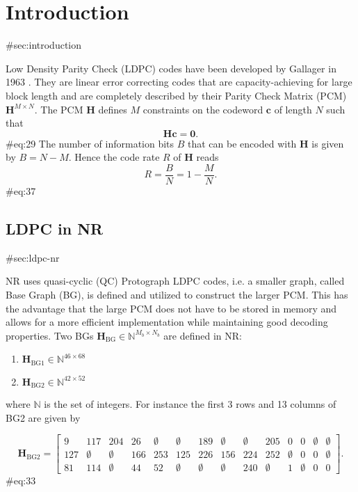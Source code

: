 \documentclass{article}
\def\0{\mathbf{0}}
\def\c{\mathbf{c}}
\def\H{\mathbf{H}}
\def\Hbg{\mathbf{H}_\mathrm{BG}}
\def\Hbgo{\mathbf{H}_\mathrm{BG1}}
\def\Hbgt{\mathbf{H}_\mathrm{BG2}}
\def\Mb{{M_b}}
\def\Nb{{N_b}}
\def\Nbb{\mathbb{N}}
\begin{document}
\newpage
\tableofcontents

\newpage
\section{Introduction} {#sec:introduction}

Low Density Parity Check (LDPC) codes have been developed by Gallager in 1963 \cite{gallager1962low}. They are linear error correcting codes that are capacity-achieving for large block length and are completely described by their Parity Check Matrix (PCM) $\H^{M\times N}$. The PCM $\H$ defines $M$ constraints on the codeword $\c$ of length $N$ such that
\begin{equation}
	\H\c = \0.
\end{equation} {#eq:29}
The number of information bits $B$ that can be encoded with $\H$ is given by $B=N-M$. Hence the code rate $R$ of $\H$ reads
\begin{equation}
  R = \frac{B}{N} = 1-\frac{M}{N}.
\end{equation} {#eq:37}


\subsection{LDPC in NR}{#sec:ldpc-nr}

NR uses quasi-cyclic (QC) Protograph LDPC codes, i.e. a smaller graph, called Base Graph (BG), is defined and utilized to construct the larger PCM. This has the advantage that the large PCM does not have to be stored in memory and allows for a more efficient implementation while maintaining good decoding properties.
Two BGs $\Hbg\in\Nbb^{\Mb\times \Nb}$ are defined in NR:
\begin{enumerate}
\item $\Hbgo\in\Nbb^{46\times 68}$
\item $\Hbgt\in\Nbb^{42\times 52}$
\end{enumerate}
where $\Nbb$ is the set of integers. For instance the first 3 rows and 13 columns of BG2 are given by

\setcounter{MaxMatrixCols}{30}
\begin{equation*}
  \Hbgt =
  \begin{bmatrix}
    9   & 117       & 204       & 26  & \emptyset & \emptyset & 189       & \emptyset & \emptyset & 205       & 0         & 0         & \emptyset & \emptyset \\
    127 & \emptyset & \emptyset & 166 & 253       & 125       & 226       & 156       & 224       & 252       & \emptyset & 0         & 0         & \emptyset \\
    81  & 114       & \emptyset & 44  & 52        & \emptyset & \emptyset & \emptyset & 240       & \emptyset & 1         & \emptyset & 0         & 0
  \end{bmatrix}.
\end{equation*}{#eq:33}
\end{document}

